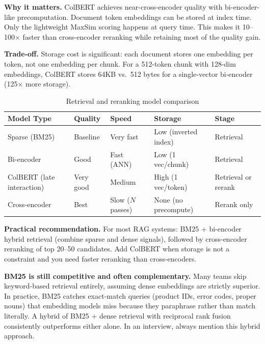 \textbf{Why it matters.} ColBERT achieves near-cross-encoder quality with bi-encoder-like precomputation. Document token embeddings can be stored at index time. Only the lightweight MaxSim scoring happens at query time. This makes it 10--100$\times$ faster than cross-encoder reranking while retaining most of the quality gain.

\textbf{Trade-off.} Storage cost is significant: each document stores one embedding per token, not one embedding per chunk. For a 512-token chunk with 128-dim embeddings, ColBERT stores 64KB vs.\ 512 bytes for a single-vector bi-encoder (125$\times$ more storage).

\begin{table}[H]
\centering
\caption{Retrieval and reranking model comparison}
\begin{tabularx}{\textwidth}{lXXXl}
\toprule
\textbf{Model Type} & \textbf{Quality} & \textbf{Speed} & \textbf{Storage} & \textbf{Stage} \\
\midrule
Sparse (BM25) & Baseline & Very fast & Low (inverted index) & Retrieval \\
Bi-encoder & Good & Fast (ANN) & Low (1 vec/chunk) & Retrieval \\
ColBERT (late interaction) & Very good & Medium & High (1 vec/token) & Retrieval or rerank \\
Cross-encoder & Best & Slow ($N$ passes) & None (no precompute) & Rerank only \\
\bottomrule
\end{tabularx}
\end{table}

\textbf{Practical recommendation.} For most RAG systems: BM25 + bi-encoder hybrid retrieval (combine sparse and dense signals), followed by cross-encoder reranking of top 20--50 candidates. Add ColBERT when storage is not a constraint and you need faster reranking than cross-encoders.

\begin{warningbox}
\textbf{BM25 is still competitive and often complementary.} Many teams skip keyword-based retrieval entirely, assuming dense embeddings are strictly superior. In practice, BM25 catches exact-match queries (product IDs, error codes, proper nouns) that embedding models miss because they paraphrase rather than match literally. A hybrid of BM25 + dense retrieval with reciprocal rank fusion consistently outperforms either alone. In an interview, always mention this hybrid approach.
\end{warningbox}

